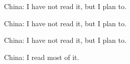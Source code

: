 \item China: I have not read it, but I plan to. 
\item China: I have not read it, but I plan to. 
\item China: I have not read it, but I plan to. 
\item China: I read most of it. 
